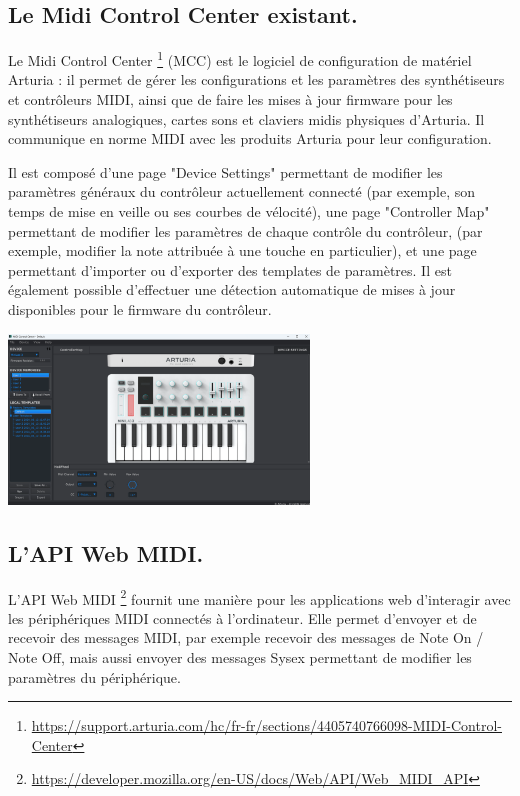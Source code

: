 \documentclass[francais]{rapportPFE}  %
\begin{document}
\subsection{Le Midi Control Center existant.}

Le Midi Control Center
\footnote{\url{https://support.arturia.com/hc/fr-fr/sections/4405740766098-MIDI-Control-Center}}
 (MCC) est le logiciel de configuration de matériel Arturia : il
permet de gérer les configurations et les paramètres des synthétiseurs et contrôleurs MIDI, ainsi que de faire les mises à jour firmware pour les synthétiseurs analogiques, cartes sons et claviers midis physiques d’Arturia. Il communique en norme MIDI avec les produits Arturia pour leur configuration.

Il est composé d'une page "Device Settings" permettant de modifier les paramètres généraux du contrôleur actuellement connecté (par exemple, son temps de mise en veille ou ses courbes de vélocité), une page "Controller Map" permettant de modifier les paramètres de chaque contrôle du contrôleur, (par exemple, modifier la note attribuée à une touche en particulier), et une page permettant d'importer ou d'exporter des templates de paramètres. Il est également possible d'effectuer une détection automatique de mises à jour disponibles pour le firmware du contrôleur.

\begin{center}
	\centering
	\includegraphics[width=0.6\textwidth]{graphics/mcc_existant.png}
	\begin{tiny}
	\end{tiny}
	\label{fig}
\end{center}


\subsection{L'API Web MIDI.}

L'API Web MIDI
\footnote{\url{https://developer.mozilla.org/en-US/docs/Web/API/Web_MIDI_API}}
fournit une manière pour les applications web d'interagir avec les périphériques MIDI connectés à l'ordinateur. Elle permet d'envoyer et de recevoir des messages MIDI, par exemple recevoir des messages de Note On / Note Off, mais aussi envoyer des messages Sysex permettant de modifier les paramètres du périphérique.
\end{document}
